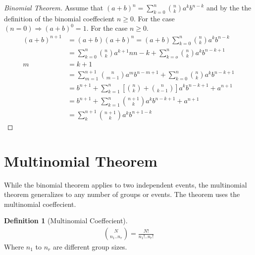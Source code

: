 \documentclass{article}
\theoremstyle{plain}
\theoremstyle{definition}
\newtheorem{definition}{Definition}
\theoremstyle{remark}
\begin{document}
\begin{proof}[Binomial Theorem]
  Assume that $(a + b)^n = \sum_{k=0}^{n} \binom{n}{k} a^kb^{n-k}$ and by the the definition of the binomial coeffecient $n \geq 0$. For the case $(n = 0) \Rightarrow (a + b)^0 = 1$. For the case $n \ge 0$.
  \begin{align*}
    (a + b)^{n+1} &= (a + b)(a + b)^n = (a+b)\sum_{k=0}^{n}\binom{n}{k}a^kb^{n-k} \\
                  &= \sum^{n}_{k=0}\binom{n}{k}a^{k+1}n{n-k} + \sum^{n}_{k=o}\binom{n}{k}a^{k}b^{n-k+1} \\
    m &= k + 1 \\
                  &= \sum^{n+1}_{m=1}\binom{n}{m-1}a^{m}b^{n-m+1}+\sum^{n}_{k=0}\binom{n}{k}a^{k}b^{n-k+1} \\
                  &= b^{n+1}+\sum^{n}_{k=1}[\binom{n}{k} + \binom{n}{k-1}]a^kb^{n-k+1}+a^{n+1}\\
                  &= b^{n+1}+\sum^{n}_{k=1}\binom{n+1}{k}a^{k}b^{n-k+1}+a^{n+1} \\
                  &= \sum^{n+1}_{k}\binom{n+1}{k}a^{k}b^{n+1-k}
  \end{align*}
\end{proof}


\section{Multinomial Theorem}
While the binomial theorem applies to two independent events, the multinomial theorem generalizes to any number of groups or events. The theorem uses the multinomial coeffecient.
\begin{definition}[Multinomial Coeffecient]
  \begin{align*}
    \binom{N}{n_1..n_r} = \frac{N!}{n_1!..n_r!}
  \end{align*}
  Where $n_1$ to $n_r$ are different group sizes.
\end{definition}
\end{document}
